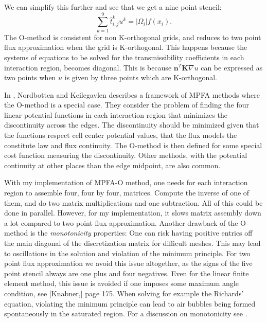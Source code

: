 \documentclass[../Main/main.tex]{subfiles}
\begin{document}
	We can simplify this further and see that we get a nine point stencil:
	\begin{equation*}
		\sum_{k=1}^9 \hat{t}^{k}_{i,j}u^k = |\Omega_i|f(x_i).
	\end{equation*}
	The O-method is consistent for non K-orthogonal grids, and reduces to two point flux approximation when the grid is K-orthogonal. This happens because the systems of equations to be solved for the transmissibility coefficients in each interaction region, becomes diagonal. This is because $\bm{n}^T \bm{K} \nabla u$ can be expressed as two points when $u$ is given by three points which are K-orthogonal.
	\par
	In \cite{nordbotten2020introduction}, Nordbotten and Keilegavlen describes a framework of MPFA methods where the O-method is a special case. They consider the problem of finding the four linear potential functions in each interaction region that minimizes the discontinuity across the edges. The discontinuity should be minimized given that the functions respect cell center potential values, that the flux models the constitute law and flux continuity. The O-method is then defined for some special cost function measuring the discontinuity. Other methods, with the potential continuity at other places than the edge midpoint, are also common.
	\par 
	With my implementation of MPFA-O method, one needs for each interaction region to assemble four, four by four, matrices. Compute the inverse of one of them, and do two matrix multiplications and one subtraction. All of this could be done in parallel. However, for my implementation, it slows matrix assembly down a lot compared to two point flux approximation. Another drawback of the O-method is the \emph{monotonicity} properties: One can risk having positive entries off the main diagonal of the discretization matrix for difficult meshes. This may lead to oscillations in the solution and violation of the minimum principle. For two point flux approximation we avoid this issue altogether, as the signs of the five point stencil always are one plus and four negatives. Even for the linear finite element method, this issue is avoided if one imposes some maximum angle condition, see [Knabner,\cite{Knabner}] page 175. When solving for example the Richards' equation, violating the minimum principle can lead to air bubbles being formed spontaneously in the saturated region. For a discussion on monotonicity see \cite{10.1007/s00211-006-0060-z}.
\end{document}
